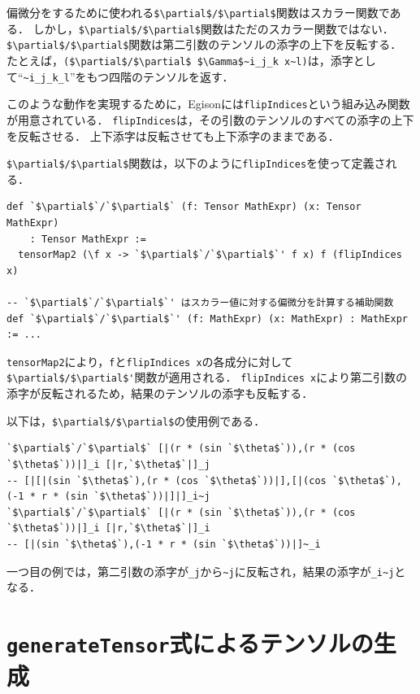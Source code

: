 偏微分をするために使われる\lstinline[mathescape]!$\partial$/$\partial$!関数はスカラー関数である．
しかし，\lstinline[mathescape]!$\partial$/$\partial$!関数はただのスカラー関数ではない．
\lstinline[mathescape]!$\partial$/$\partial$!関数は第二引数のテンソルの添字の上下を反転する．
たとえば，\lstinline[mathescape]|($\partial$/$\partial$ $\Gamma$~i_j_k x~l)|は，添字として``\lstinline|~i_j_k_l|''をもつ四階のテンソルを返す．

このような動作を実現するために，Egisonには\lstinline{flipIndices}という組み込み関数が用意されている．
\lstinline{flipIndices}は，その引数のテンソルのすべての添字の上下を反転させる．
上下添字は反転させても上下添字のままである．

\lstinline[mathescape]!$\partial$/$\partial$!関数は，以下のように\lstinline{flipIndices}を使って定義される．
\begin{lstlisting}[language=egison,numbers=none]
def `$\partial$`/`$\partial$` (f: Tensor MathExpr) (x: Tensor MathExpr)
    : Tensor MathExpr :=
  tensorMap2 (\f x -> `$\partial$`/`$\partial$`' f x) f (flipIndices x)

-- `$\partial$`/`$\partial$`' はスカラー値に対する偏微分を計算する補助関数
def `$\partial$`/`$\partial$`' (f: MathExpr) (x: MathExpr) : MathExpr := ...
\end{lstlisting}

\lstinline{tensorMap2}により，\lstinline{f}と\lstinline{flipIndices x}の各成分に対して\lstinline[mathescape]!$\partial$/$\partial$'!関数が適用される．
\lstinline{flipIndices x}により第二引数の添字が反転されるため，結果のテンソルの添字も反転する．

以下は，\lstinline[mathescape]!$\partial$/$\partial$!の使用例である．
\begin{lstlisting}[language=egison,numbers=none]
`$\partial$`/`$\partial$` [|(r * (sin `$\theta$`)),(r * (cos `$\theta$`))|]_i [|r,`$\theta$`|]_j
-- [|[|(sin `$\theta$`),(r * (cos `$\theta$`))|],[|(cos `$\theta$`),(-1 * r * (sin `$\theta$`))|]|]_i~j
`$\partial$`/`$\partial$` [|(r * (sin `$\theta$`)),(r * (cos `$\theta$`))|]_i [|r,`$\theta$`|]_i
-- [|(sin `$\theta$`),(-1 * r * (sin `$\theta$`))|]~_i
\end{lstlisting}

一つ目の例では，第二引数の添字が\lstinline{_j}から\lstinline{~j}に反転され，結果の添字が\lstinline{_i~j}となる．

\section{\texttt{generateTensor}式によるテンソルの生成}


